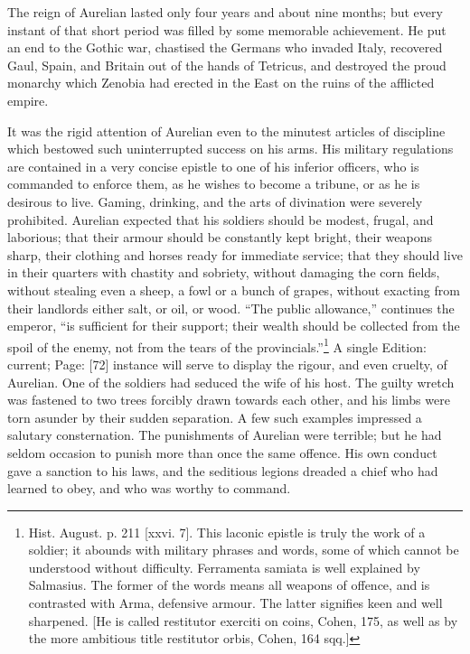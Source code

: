 The reign of Aurelian lasted only four years and about nine months; but every instant of that short period was filled by some memorable achievement. He put an end to the Gothic war, chastised the Germans who invaded Italy, recovered Gaul, Spain, and Britain out of the hands of Tetricus, and destroyed the proud monarchy which Zenobia had erected in the East on the ruins of the afflicted empire.

It was the rigid attention of Aurelian even to the minutest articles of discipline which bestowed such uninterrupted success on his arms. His military regulations are contained in a very concise epistle to one of his inferior officers, who is commanded to enforce them, as he wishes to become a tribune, or as he is desirous to live. Gaming, drinking, and the arts of divination were severely prohibited. Aurelian expected that his soldiers should be modest, frugal, and laborious; that their armour should be constantly kept bright, their weapons sharp, their clothing and horses ready for immediate service; that they should live in their quarters with chastity and sobriety, without damaging the corn fields, without stealing even a sheep, a fowl or a bunch of grapes, without exacting from their landlords either salt, or oil, or wood. \texthebrew{“}The public allowance,\texthebrew{}” continues the emperor, \texthebrew{“}is sufficient for their support; their wealth should be collected from the spoil of the enemy, not from the tears of the provincials.\texthebrew{}”\footnote{Hist. August. p. 211 [xxvi. 7]. This laconic epistle is truly the work of a soldier; it abounds with military phrases and words, some of which cannot be understood without difficulty. Ferramenta samiata is well explained by Salmasius. The former of the words means all weapons of offence, and is contrasted with Arma, defensive armour. The latter signifies keen and well sharpened. [He is called restitutor exerciti on coins, Cohen, 175, as well as by the more ambitious title restitutor orbis, Cohen, 164 sqq.]} A single Edition: current; Page: [72] instance will serve to display the rigour, and even cruelty, of Aurelian. One of the soldiers had seduced the wife of his host. The guilty wretch was fastened to two trees forcibly drawn towards each other, and his limbs were torn asunder by their sudden separation. A few such examples impressed a salutary consternation. The punishments of Aurelian were terrible; but he had seldom occasion to punish more than once the same offence. His own conduct gave a sanction to his laws, and the seditious legions dreaded a chief who had learned to obey, and who was worthy to command.

